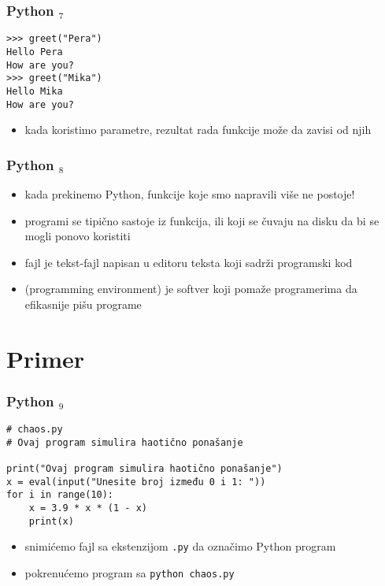 \documentclass[utf8,compress,aspectratio=169]{beamer}
\begin{document}
\begin{frame}[fragile]
\frametitle{Python $_7$}
\begin{verbatim}
>>> greet("Pera")
Hello Pera
How are you?
>>> greet("Mika")
Hello Mika
How are you?
\end{verbatim}
\begin{itemize}
  \item kada koristimo parametre, rezultat rada funkcije može da zavisi od njih
\end{itemize}
\end{frame}

\begin{frame}[fragile]
\frametitle{Python $_8$}
\begin{itemize}
  \item kada prekinemo Python, funkcije koje smo napravili više ne postoje!
  \item programi se tipično sastoje iz funkcija,  ili  koji se čuvaju na disku da bi se mogli ponovo koristiti
  \item {} fajl je tekst-fajl napisan u editoru teksta koji sadrži programski kod
  \item {} (programming environment) je softver koji pomaže programerima da efikasnije pišu programe
\end{itemize}
\end{frame}

\section{Primer}

\begin{frame}[fragile]
\frametitle{Python $_9$}
\begin{verbatim}
# chaos.py
# Ovaj program simulira haotično ponašanje

print("Ovaj program simulira haotično ponašanje")
x = eval(input("Unesite broj između 0 i 1: "))
for i in range(10):
    x = 3.9 * x * (1 - x)
    print(x)
\end{verbatim}
\begin{itemize}
  \item snimićemo fajl sa ekstenzijom \texttt{.py} da označimo Python program
  \item pokrenućemo program sa \texttt{python chaos.py}
\end{itemize}
\end{frame}
\end{document}

